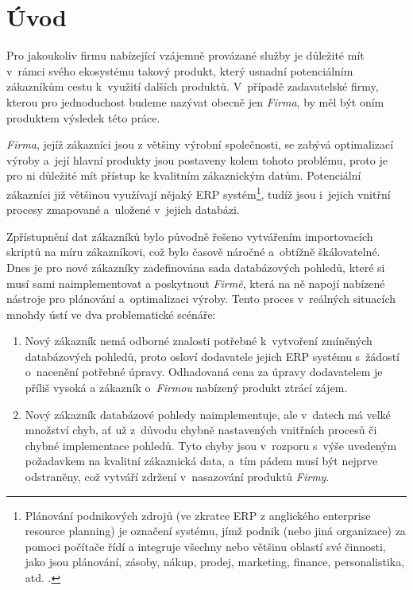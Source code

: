 \chapter{Úvod}\label{chap:intro}

Pro jakoukoliv firmu nabízející vzájemně provázané služby je důležité mít v~rámci svého ekosystému takový produkt, který usnadní potenciálním zákazníkům cestu k~využití dalších produktů.
V~případě zadavatelské firmy, kterou pro jednoduchost budeme nazývat obecně jen \textit{Firma}, by měl být oním produktem výsledek této práce.

\textit{Firma}, jejíž zákazníci jsou z většiny výrobní společnosti, se zabývá optimalizací výroby a~její hlavní produkty jsou postaveny kolem tohoto problému, proto je pro ni důležité mít přístup ke kvalitním zákaznickým datům.
Potenciální zákazníci již většinou využívají nějaký ERP systém\footnote{Plánování podnikových zdrojů (ve zkratce ERP z anglického enterprise resource planning) je označení systému, jímž podnik (nebo jiná organizace) za pomoci počítače řídí a integruje všechny nebo většinu oblastí své činnosti, jako jsou plánování, zásoby, nákup, prodej, marketing, finance, personalistika, atd. \cite{ERP}.},
tudíž jsou i~jejich vnitřní procesy zmapované a~uložené v~jejich databázi.

Zpřístupnění dat zákazníků bylo původně řešeno vytvářením importovacích skriptů na míru zákazníkovi, což bylo časově náročné a~obtížně škálovatelné.
Dnes je pro nové zákazníky zadefinována sada databázových pohledů, které si musí sami naimplementovat a poskytnout \textit{Firmě}, která na ně napojí nabízené nástroje pro plánování a~optimalizaci výroby.
Tento proces v~reálných situacích mnohdy ústí ve dva problematické scénáře:

\begin{enumerate}
    \item {
        Nový zákazník nemá odborné znalosti potřebné k~vytvoření zmíněných databázových pohledů, proto osloví dodavatele jejich ERP systému s~žádostí o~nacenění potřebné úpravy.
        Odhadovaná cena za úpravy dodavatelem je příliš vysoká a zákazník o~\textit{Firmou} nabízený produkt ztrácí zájem.
    }
    \item {
        Nový zákazník databázové pohledy naimplementuje, ale v~datech má velké množství chyb, ať už z~důvodu chybně nastavených vnitřních procesů či chybné implementace pohledů.
        Tyto chyby jsou v~rozporu s~výše uvedeným požadavkem na kvalitní zákaznická data, a~tím pádem musí být nejprve odstraněny, což vytváří zdržení v~nasazování produktů \textit{Firmy}.
    }
\end{enumerate}

